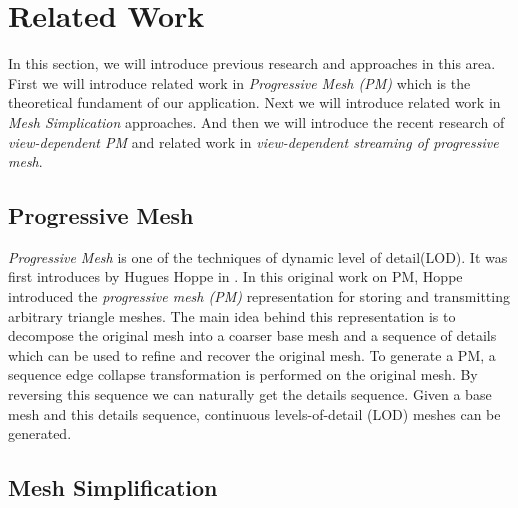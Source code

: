 
\section{Related Work}
\label{section:relWork}

In this section, we will introduce previous research and approaches in this area. 
First we will introduce related work in \emph{Progressive Mesh (PM)} which is the theoretical fundament of our application.
Next we will introduce related work in \emph{Mesh Simplication} approaches.   
And then we will introduce the recent research of \emph{view-dependent PM} and related work in \emph{view-dependent streaming of progressive mesh}. 

\subsection{Progressive Mesh}
\label{subsection:relWork:pm}

\emph{Progressive Mesh} is one of the techniques of dynamic level of detail(LOD). It was first introduces by Hugues Hoppe in \cite{Hoppe:1996:PM}. In this original work on PM, Hoppe introduced the \emph{progressive mesh (PM)} representation for storing and transmitting arbitrary triangle meshes. The main idea behind this representation is to decompose the original mesh into a coarser base mesh and a sequence of details which can be used to refine and recover the original mesh. To generate a PM, a sequence edge collapse transformation is performed on the original mesh. By reversing this sequence we can naturally get the details sequence. Given a base mesh and this details sequence, continuous levels-of-detail (LOD) meshes can be generated.  

\subsection{Mesh Simplification}
\label{subsection:relWork:meshsimp}

